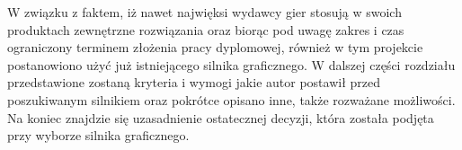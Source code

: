 \documentclass[11pt]{mwrep}
\begin{document}

    W związku z faktem, iż nawet najwięksi wydawcy gier stosują w swoich produktach zewnętrzne rozwiązania oraz biorąc pod uwagę zakres i czas ograniczony terminem złożenia pracy dyplomowej, również w tym projekcie postanowiono użyć już istniejącego silnika graficznego. W dalszej części rozdziału przedstawione zostaną kryteria i wymogi jakie autor postawił przed poszukiwanym silnikiem oraz pokrótce opisano inne, także rozważane możliwości. Na koniec znajdzie się uzasadnienie ostatecznej decyzji, która została podjęta przy wyborze silnika graficznego.

\end{document}
